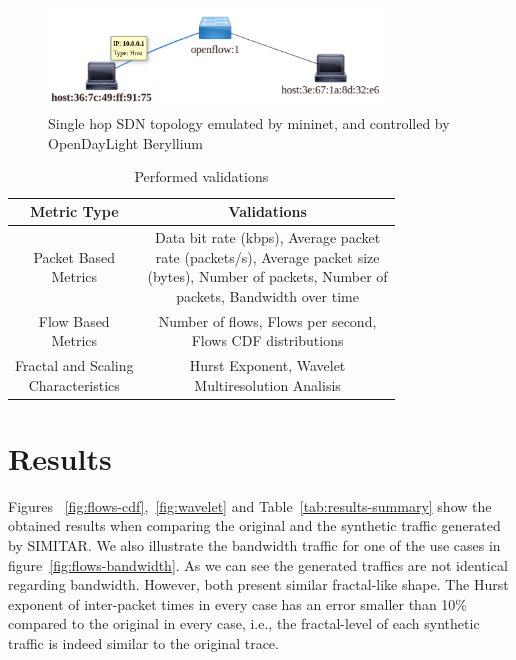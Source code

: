 \begin{figure}[!ht]
    \centering
    \includegraphics[width=0.8\textwidth]{figures/ch5/topo-simple}
    \caption{Single hop SDN topology emulated by mininet, and controlled by OpenDayLight Beryllium}
    \label{fig:topo-simple}
\end{figure}


\begin{table}[!htb]
	\centering
	\caption{Performed validations}
		\begin{tabular}{c c}
			\toprule
			\textbf{Metric Type} & \textbf{Validations} \\
			\midrule
			\makecell{Packet Based \\Metrics}                & \makecell{Data bit rate (kbps), Average packet\\
				rate (packets/s), Average packet size\\
				(bytes), Number of packets, Number of\\
				packets, Bandwidth over time}\\
			
			\makecell{Flow Based \\ Metrics}                & \makecell{Number of flows, Flows per second, \\
				Flows CDF distributions}\\
			
			\makecell{Fractal and Scaling \\ Characteristics} & \makecell{Hurst Exponent, Wavelet \\
				Multiresolution Analisis}\\
			\bottomrule
		\end{tabular}
	\label{tab:validation-tests-performed}
\end{table}


\section{Results}


Figures ~\ref{fig:flows-cdf},~\ref{fig:wavelet} and Table~\ref{tab:results-summary} show the obtained results when comparing the original and the synthetic traffic generated by SIMITAR. We also illustrate the bandwidth traffic for one of the use cases in figure~\ref{fig:flows-bandwidth}. As we can see the generated traffics are not identical regarding bandwidth. However, both present similar fractal-like shape. The Hurst exponent of inter-packet times in every case has an error smaller than 10\% compared to the original in every case, i.e., the fractal-level of each synthetic traffic is indeed similar to the original trace.

